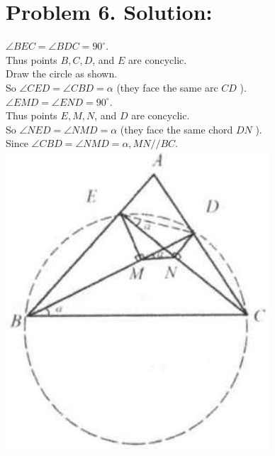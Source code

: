\documentclass[10pt]{article}
\begin{document}
\section*{Problem 6. Solution:}
\(\angle B E C=\angle B D C=90^{\circ}\).\\
Thus points \(B, C, D\), and \(E\) are concyclic.\\
Draw the circle as shown.\\
So \(\angle C E D=\angle C B D=\alpha\) (they face the same arc \(C D\) ).\\
\(\angle E M D=\angle E N D=90^{\circ}\).\\
Thus points \(E, M, N\), and \(D\) are concyclic.\\
So \(\angle N E D=\angle N M D=\alpha\) (they face the same chord \(D N\) ).\\
Since \(\angle C B D=\angle N M D=\alpha, M N / / B C\).\\
\includegraphics[max width=\textwidth, center]{2025_04_17_97bc1f7e44d93c271a88g-210(2)}
\end{document}
